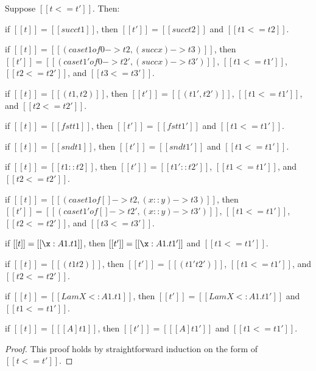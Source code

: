 \begin{lemma}
  \label{lemma:inversion_of_term_precision}
  Suppose $[[t <= t']]$. Then:
  \begin{enumR}\small
  \item if $[[t]] = [[succ t1]]$, then $[[t']] = [[succ t2]]$ and $[[t1 <= t2]]$.
  \item if $[[t]] = [[(case t1 of 0 -> t2, (succ x) -> t3)]]$, then
    $[[t']] = [[(case t1' of 0 -> t2', (succ x) -> t3')]]$, $[[t1 <= t1']]$, $[[t2 <= t2']]$, and $[[t3 <= t3']]$.
  \item if $[[t]] = [[(t1,t2)]]$, then $[[t']] = [[(t1',t2')]]$, $[[t1 <= t1']]$, and $[[t2 <= t2']]$.
  \item if $[[t]] = [[fst t1]]$, then $[[t']] = [[fst t1']]$ and $[[t1 <= t1']]$.
  \item if $[[t]] = [[snd t1]]$, then $[[t']] = [[snd t1']]$ and $[[t1 <= t1']]$.
  \item if $[[t]] = [[t1::t2]]$, then $[[t']] = [[t1'::t2']]$, $[[t1 <= t1']]$, and $[[t2 <= t2']]$.
  \item if $[[t]] = [[(case t1 of [] -> t2, (x::y) -> t3)]]$, then
    $[[t']] = [[(case t1' of [] -> t2', (x::y) -> t3')]]$, $[[t1 <= t1']]$, $[[t2 <= t2']]$, and $[[t3 <= t3']]$.
  \item if $[[t]] = [[\x:A1.t1]]$, then $[[t']] = [[\x:A1.t1']]$ and $[[t1 <= t1']]$.
  \item if $[[t]] = [[(t1 t2)]]$, then $[[t']] = [[(t1' t2')]]$, $[[t1 <= t1']]$, and $[[t2 <= t2']]$.
  \item if $[[t]] = [[Lam X <: A1.t1]]$, then $[[t']] = [[Lam X <: A1.t1']]$ and $[[t1 <= t1']]$.
  \item if $[[t]] = [[ [A]t1]]$, then $[[t']] = [[ [A]t1']]$ and $[[t1 <= t1']]$.
  \end{enumR}
\end{lemma}
\begin{proof}
  This proof holds by straightforward induction on the form of $[[t <= t']]$.
\end{proof}

